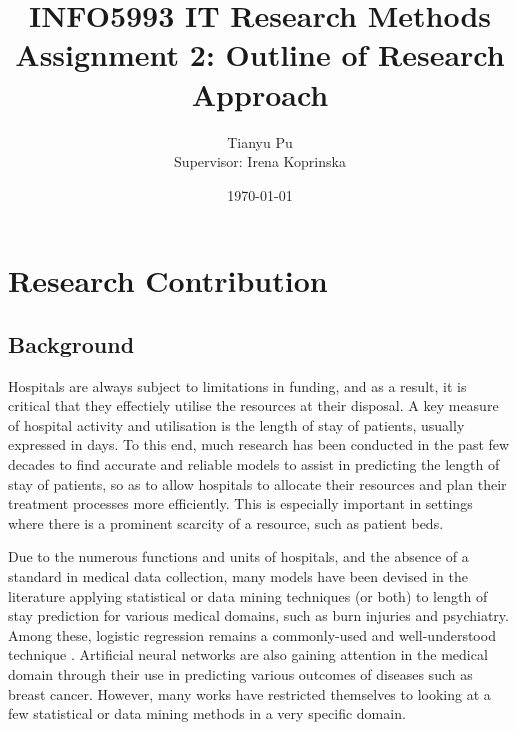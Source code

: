 \documentclass[a4paper]{article}
\title{INFO5993 IT Research Methods \\
    Assignment 2: Outline of Research Approach}
\author{Tianyu Pu \\
    Supervisor: Irena Koprinska}
\date{\today}
\begin{document}
\maketitle

\section{Research Contribution}
\subsection{Background}
Hospitals are always subject to limitations in funding, and as a result,
it is critical that they effectiely utilise the resources at their
disposal.
A key measure of hospital activity and utilisation is the length of stay
of patients, usually expressed in days. To this end, much research has been
conducted in the past few decades to find accurate and reliable models to
assist in predicting the length of stay of patients, so as to allow hospitals
to allocate their resources and plan their treatment processes more
efficiently. This is especially important in settings where there is a
prominent scarcity of a resource, such as patient beds\citep{Tu1993}.

Due to the numerous functions and units of hospitals, and the absence of a
standard in medical data collection, many models have been devised in the
literature applying statistical or data mining techniques (or both) to
length of stay prediction for various medical domains, such as burn injuries
\citep{Yang2010} and psychiatry\citep{Lowell1997}. Among these, logistic
regression remains a commonly-used and well-understood technique
\citep{Gabbe2005}\citep{Tu1996}. Artificial neural networks are also gaining
attention in the medical domain through their use in predicting various
outcomes of diseases such as breast cancer\citep{Bellazzi2008}. However,
many works have restricted themselves to looking at a few statistical or data
mining methods in a very specific domain.
\end{document}
